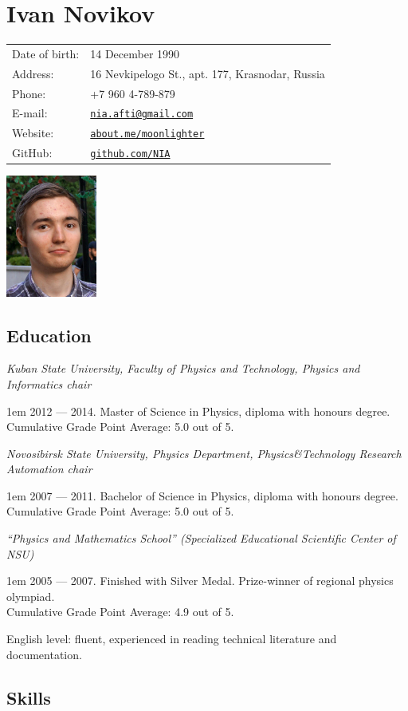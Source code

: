 \documentclass[a4paper, 12pt]{article}
\author{\theauthor}
\title{\thetitle}
\makeatletter
\newenvironment{fieldset}%
    {\begin{tabular}{ll}}%
    {\end{tabular}}
\newcommand{\field}[2]{ #1: & #2 \\ }
\newenvironment{indented}%
    { \begingroup %
        \noindent %
        \leftskip1em}%
    { \par\endgroup }
\newcommand{\education}[4]{
    \par\emph{#1}

    \begin{indented}
      #2. #3\\
      Cumulative Grade Point Average: #4 out of 5.
    \end{indented}
    \vspace{1mm} %
  }
\newcommand{\myhref}[3]{\href{#1#2#3}{\nolinkurl{#2}}}
\newcommand{\theauthor}{Ivan Novikov}
\newcommand{\themail}{nia.afti@gmail.com}
\makeatother
\begin{document}
  \begin{minipage}[h]{0.8\linewidth}
    \section*{\theauthor}

    \begin{fieldset}
      \field{Date of birth} {14 December 1990}
      \field{Address}       {16 Nevkipelogo St., apt. 177, Krasnodar, Russia}
      \field{Phone}         {+7 960 4-789-879}
      \field{E-mail}        {\myhref{mailto:}{\themail}{}}
      \field{Website}       {\myhref{https://}{about.me/moonlighter}{}}
      \field{GitHub}        {\myhref{https://}{github.com/NIA}{?tab=repositories}}
    \end{fieldset}
  \end{minipage}
  \begin{minipage}[h]{0.19\linewidth}
    \includegraphics[width=3cm]{photoa}
  \end{minipage}

  \subsection*{Education}

  \education{Kuban State University, Faculty of Physics and Technology, Physics and Informatics chair}
            {2012 — 2014}{Master of Science in Physics, diploma with honours degree.}{5.0}
  \education{Novosibirsk State University, Physics Department, Physics\&Technology Research Automation chair}
            {2007 — 2011}{Bachelor of Science in Physics, diploma with honours degree.}{5.0}
  \education{``Physics and Mathematics School'' (Specialized Educational Scientific Center of NSU)}
            {2005 — 2007}{Finished with Silver Medal. Prize-winner of regional physics olympiad.}{4.9}

  English level: fluent, experienced in reading technical literature and documentation.

  \subsection*{Skills}
\end{document}
